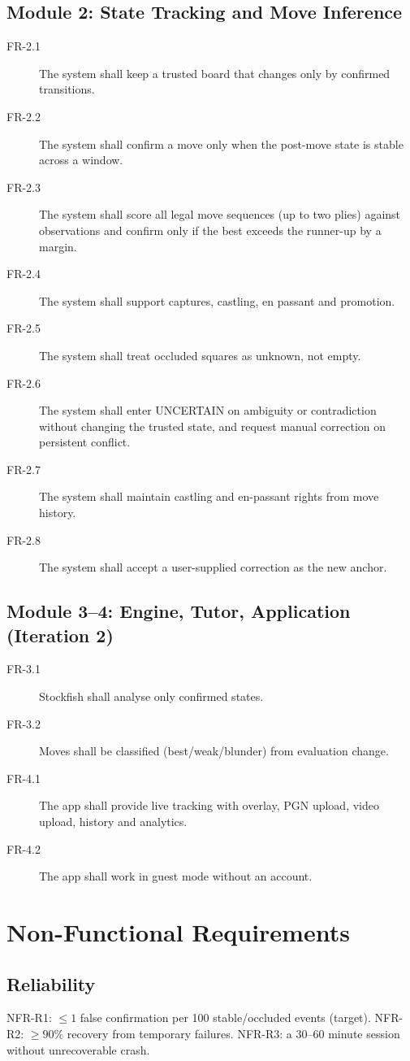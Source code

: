 \subsection{Module 2: State Tracking and Move Inference}
\begin{description}
\item[FR-2.1] The system shall keep a trusted board that changes only by confirmed transitions.
\item[FR-2.2] The system shall confirm a move only when the post-move state is stable across a window.
\item[FR-2.3] The system shall score all legal move sequences (up to two plies) against observations and confirm only if the best exceeds the runner-up by a margin.
\item[FR-2.4] The system shall support captures, castling, en passant and promotion.
\item[FR-2.5] The system shall treat occluded squares as unknown, not empty.
\item[FR-2.6] The system shall enter UNCERTAIN on ambiguity or contradiction without changing the trusted state, and request manual correction on persistent conflict.
\item[FR-2.7] The system shall maintain castling and en-passant rights from move history.
\item[FR-2.8] The system shall accept a user-supplied correction as the new anchor.
\end{description}
\subsection{Module 3--4: Engine, Tutor, Application (Iteration 2)}
\begin{description}
\item[FR-3.1] Stockfish shall analyse only confirmed states. \quad
\item[FR-3.2] Moves shall be classified (best/weak/blunder) from evaluation change.
\item[FR-4.1] The app shall provide live tracking with overlay, PGN upload, video upload, history and analytics.
\item[FR-4.2] The app shall work in guest mode without an account.
\end{description}

\section{Non-Functional Requirements}
\subsection{Reliability}
NFR-R1: $\leq 1$ false confirmation per 100 stable/occluded events (target). NFR-R2: $\geq 90\%$ recovery from temporary failures. NFR-R3: a 30--60 minute session without unrecoverable crash.
